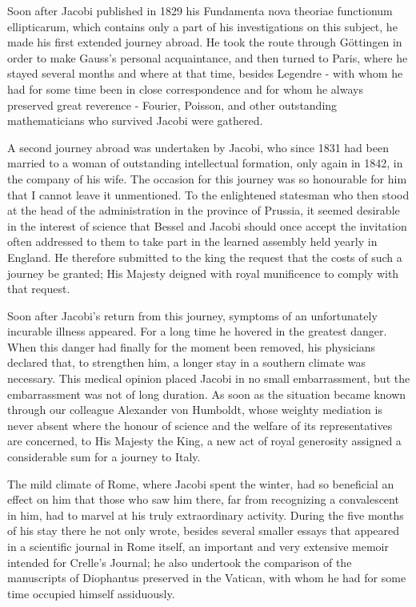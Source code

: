 \documentclass[11pt]{article}
\begin{document}
Soon after Jacobi published in 1829 his Fundamenta nova theoriae functionum ellipticarum, which contains only a part of his investigations on this subject, he made his first extended journey abroad. He took the route through Göttingen in order to make Gauss's personal acquaintance, and then turned to Paris, where he stayed several months and where at that time, besides Legendre - with whom he had for some time been in close correspondence and for whom he always preserved great reverence - Fourier, Poisson, and other outstanding mathematicians who survived Jacobi were gathered.

A second journey abroad was undertaken by Jacobi, who since 1831 had been married to a woman of outstanding intellectual formation, only again in 1842, in the company of his wife. The occasion for this journey was so honourable for him that I cannot leave it unmentioned. To the enlightened statesman who then stood at the head of the administration in the province of Prussia, it seemed desirable in the interest of science that Bessel and Jacobi should once accept the invitation often addressed to them to take part in the learned assembly held yearly in England. He therefore submitted to the king the request that the costs of such a journey be granted; His Majesty deigned with royal munificence to comply with that request.

Soon after Jacobi's return from this journey, symptoms of an unfortunately incurable illness appeared. For a long time he hovered in the greatest danger. When this danger had finally for the moment been removed, his physicians declared that, to strengthen him, a longer stay in a southern climate was necessary. This medical opinion placed Jacobi in no small embarrassment, but the embarrassment was not of long duration. As soon as the situation became known through our colleague Alexander von Humboldt, whose weighty mediation is never absent where the honour of science and the welfare of its representatives are concerned, to His Majesty the King, a new act of royal generosity assigned a considerable sum for a journey to Italy.

The mild climate of Rome, where Jacobi spent the winter, had so beneficial an effect on him that those who saw him there, far from recognizing a convalescent in him, had to marvel at his truly extraordinary activity. During the five months of his stay there he not only wrote, besides several smaller essays that appeared in a scientific journal in Rome itself, an important and very extensive memoir intended for Crelle's Journal; he also undertook the comparison of the manuscripts of Diophantus preserved in the Vatican, with whom he had for some time occupied himself assiduously.
\end{document}
